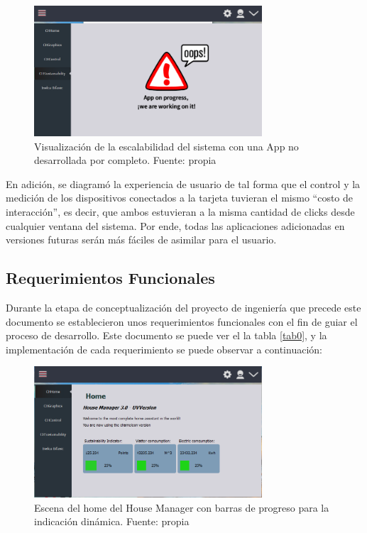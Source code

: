 \begin{figure}[htbp]
	\centerline{\includegraphics[width=8.5cm]{figuras/housemanager_newapp.png}}
	\caption{Visualización de la escalabilidad del sistema con una App no desarrollada por completo. Fuente: propia}
	\label{fig_6}
\end{figure}

En adición, se diagramó la experiencia de usuario de tal forma que el control y la medición de los dispositivos conectados a la tarjeta tuvieran el mismo ``costo de interacción'', es decir, que ambos estuvieran a la misma cantidad de clicks desde cualquier ventana del sistema. Por ende, todas las aplicaciones adicionadas en versiones futuras serán más fáciles de asimilar para el usuario.

\subsection{Requerimientos Funcionales}

Durante la etapa de conceptualización del proyecto de ingeniería que precede este documento se establecieron unos requerimientos funcionales con el fin de guiar el proceso de desarrollo. Este documento se puede ver el la tabla \ref{tab0}, y la implementación de cada requerimiento se puede observar a continuación:

\begin{figure}[htbp]
	\centerline{\includegraphics[width=8.5cm]{figuras/housemanager_home.png}}
	\caption{Escena del home del House Manager con barras de progreso para la indicación dinámica. Fuente: propia}
	\label{fig_7}
\end{figure}

